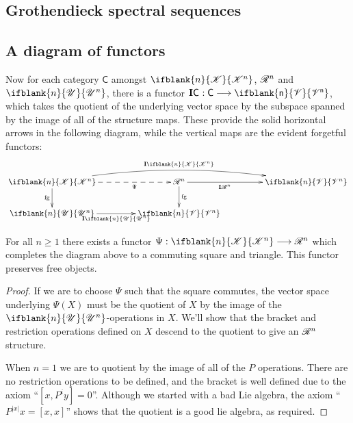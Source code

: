 \documentclass[10pt]{article}
\newcommand{\GS}[1]{\scrE^{#1}}
\newcommand{\PRLie}[1]{\scrR^{#1}}%
\newcommand{\LL}[1]{\ifblank{#1}{\scrK}{\scrK^{#1}}}
\newcommand{\GR}[1]{\ifblank{#1}{\scrV}{\scrV^{#1}}}
\newcommand{\nontop}[1]{\ifblank{#1}{\scrU}{\scrU^{#1}}}
\newcommand{\Ind}[2][]{\mathbf{I}{#2}_{#1}}%
\newcommand{\forget}{\mathrm{fg}}
\begin{document}
\begin{DiagramOfFunctors}
\section{Grothendieck spectral sequences}
\subsection{A diagram of functors}
Now for each category $\mathsf{C}$ amongst $\LL{n}$, $\PRLie{n}$ and $\nontop{n}$, there is a functor $\Ind{\mathsf{C}}:\mathsf{C\overset{}{\to}\GR{n}}$, which takes the quotient of the underlying vector space by the subspace spanned by the image of all of the structure maps. These provide the solid horizontal arrows in the following diagram, while the vertical maps are the evident forgetful functors: %
\[\xymatrix@R=8mm@C=15mm@!C{
\LL{n}
\ar@/^1.5em/[rr]^-{\Ind{\LL{n}}}
\ar[d]_-{\forget}
\ar@{-->}[r]_-{\Psi}%
&%
\PRLie{n}
\ar[d]^-{\forget}
\ar[r]_-{\Ind{\PRLie{n}}}
&%
\GR{n}
\\%
\nontop{n}
\ar[r]_-{\Ind{\nontop{n}}}
&%
\GR{n}
&%
}\]
\begin{prop}
For all $n\geq1$ there exists a functor $\Psi:\LL{n}\to\PRLie{n}$ which completes the diagram above to a commuting square and triangle. This functor %
preserves free objects.
\end{prop}
\begin{proof}
If we are to choose $\Psi$ such that the square commutes, the vector space underlying $\Psi(X)$ must be the quotient of $X$ by the image of the $\nontop{n}$-operations in $X$. We'll show that the bracket and restriction operations defined on $X$ descend to the quotient to give an $\PRLie{n}$ structure. %

When $n=1$ we are to quotient by the image of all of the $P$ operations. There are no restriction operations to be defined, and the bracket is well defined due to the axiom ``$[x,P^iy]=0$''. Although we started with a bad Lie algebra, the axiom ``$P^{|x|}x=[x,x]$'' shows that the quotient is a good lie algebra, as required.


\end{proof}
\end{DiagramOfFunctors}
\end{document}
